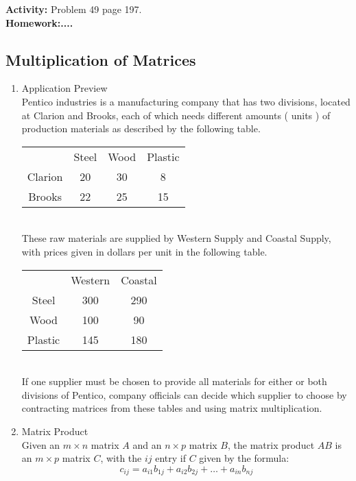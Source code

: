 \documentclass[12pt]{amsart}
\begin{document}
\textbf{Activity:} Problem 49 page 197.\\
\textbf{Homework:....} \\

\newpage
\subsection{Multiplication of Matrices}
\begin{enumerate}

\item Application Preview \\

Pentico industries is a manufacturing company that has two divisions, located at Clarion and Brooks, each of which needs different amounts ( units ) of production materials as described by the following table. \\

\begin{tabular}{|c|c|c|c|}
\hline
& Steel & Wood & Plastic \\
Clarion & 20 & 30 & 8  \\
Brooks & 22 & 25 & 15 \\
\hline
\end{tabular} \\

These raw materials are supplied by Western Supply and Coastal Supply, with prices given in dollars per unit in the following table.\\

\begin{tabular}{|c|c|c|}
\hline
& Western & Coastal \\
Steel & 300 & 290 \\
Wood & 100 & 90 \\
Plastic & 145 & 180 \\
\hline
\end{tabular}\\

If one supplier must be chosen to provide all materials for either or both divisions of Pentico, company officials can decide which supplier to choose by contracting matrices from these tables and using matrix multiplication.\\

\item Matrix Product \\
Given an $m \times n$ matrix $A $ and an $n \times p$ matrix $B$, the matrix product $AB$ is an $m \times p$ matrix $C$, with the $ij$ entry if $C$ given by the formula: \\
\[
c_{ij} = a_{i1}b_{1j} + a_{i2}b_{2j} + \dots + a_{in}b_{nj}
\]


\end{enumerate}
\end{document}
